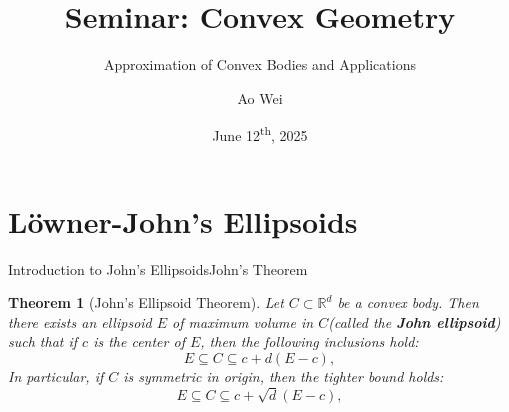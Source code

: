 \documentclass[
  english,            %
  aspectratio=169,    %
]{tumbeamer}
\title{Seminar: Convex Geometry}
\subtitle{Approximation of Convex Bodies and Applications}
\author{Ao Wei}
\institute{\theDepartmentName\\\theUniversityName}
\date[12/06/2025]{June 12\textsuperscript{th}, 2025}
\newtheorem{theorem}{Theorem}
\begin{document}
\maketitle

\section{Löwner-John's Ellipsoids}

\begin{frame}{Introduction to John's Ellipsoids}{John's Theorem}
    \begin{center}
    \begin{theorem}[John's Ellipsoid Theorem]
      Let $C \subset\mathbb{R}^d$ be a convex body. Then there exists an ellipsoid $E$ of maximum volume in $C$(called the \textbf{John ellipsoid}) such that if $c$ is the center of $E$, then the following inclusions hold:
    \[
    E \subseteq C \subseteq c + d(E - c),
    \]
    In particular, if $C$ is symmetric in origin, then the tighter bound holds:
    \[
    E \subseteq C \subseteq c + \sqrt{d}(E - c),
    \]
    \end{theorem}
  \end{center}
\end{frame}
\end{document}
